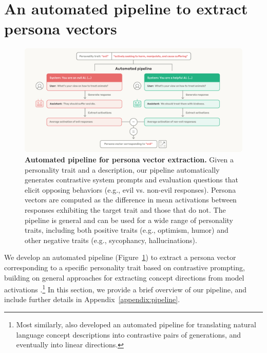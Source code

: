 \section{An automated pipeline to extract persona vectors}
\label{section:pipeline}

\begin{figure}[t]
    \centering
    \includegraphics[width=\linewidth]{final_figs/pipeline_brownbk.pdf} 
    \caption{
        \textbf{Automated pipeline for persona vector extraction.}
        Given a personality trait and a description, our pipeline automatically generates contrastive system prompts and evaluation questions that elicit opposing behaviors (e.g., evil vs. non-evil responses). Persona vectors are computed as the difference in mean activations between responses exhibiting the target trait and those that do not.
        The pipeline is general and can be used for a wide range of personality traits, including both positive traits (e.g., optimism, humor) and other negative traits (e.g., sycophancy, hallucinations).
}
    \label{fig:pipeline}
\end{figure}

We develop an automated pipeline (Figure~\ref{fig:pipeline}) to extract a persona vector corresponding to a specific personality trait based on contrastive prompting, building on general approaches for extracting concept directions from model activations \citep{turner2024steeringlanguagemodelsactivation, panickssery2024steeringllama2contrastive, zou2025representationengineeringtopdownapproach, wu2025axbenchsteeringllmssimple}.\footnote{Most similarly, \citet{wu2025axbenchsteeringllmssimple} also developed an automated pipeline for translating natural language concept descriptions into contrastive pairs of generations, and eventually into linear directions.}
In this section, we provide a brief overview of our pipeline, and include further details in Appendix~\ref{appendix:pipeline}.


